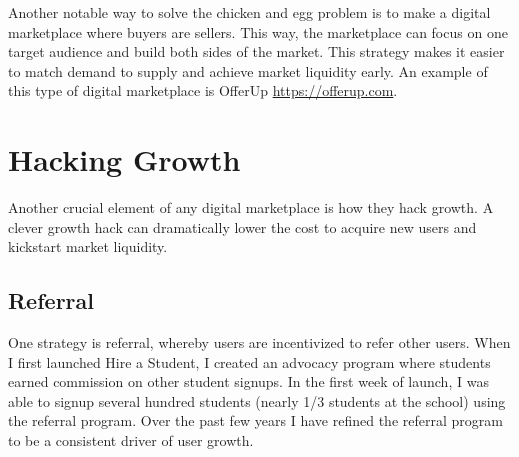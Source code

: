 Another notable way to solve the chicken and egg problem is to make a digital marketplace where buyers are sellers. This way, the marketplace can focus on one target audience and build both sides of the market. This strategy makes it easier to match demand to supply and achieve market liquidity early. An example of this type of digital marketplace is OfferUp \url{https://offerup.com}. 

\section{Hacking Growth}

Another crucial element of any digital marketplace is how they hack growth. A clever growth hack can dramatically lower the cost to acquire new users and kickstart market liquidity.

\subsection{Referral}

One strategy is referral, whereby users are incentivized to refer other users. When I first launched Hire a Student, I created an advocacy program where students earned commission on other student signups. In the first week of launch, I was able to signup several hundred students (nearly 1/3 students at the school) using the referral program.
Over the past few years I have refined the referral program to be a consistent driver of user growth.

